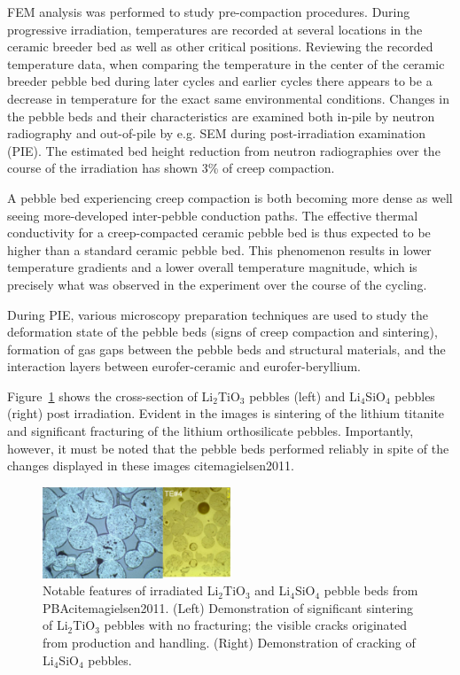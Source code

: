 FEM analysis was performed to study pre-compaction procedures.  During progressive irradiation, temperatures are recorded at several locations in the ceramic breeder bed as well as other critical positions. Reviewing the recorded temperature data, when comparing the temperature in the center of the ceramic breeder pebble bed during later cycles and earlier cycles there appears to be a decrease in temperature for the exact same environmental conditions. Changes in the pebble beds and their characteristics are examined both in-pile by neutron radiography and out-of-pile by e.g. SEM during post-irradiation examination (PIE). The estimated bed height reduction from neutron radiographies over the course of the irradiation has shown 3\% of creep compaction. 

A pebble bed experiencing creep compaction is both becoming more dense as well seeing more-developed inter-pebble conduction paths. The effective thermal conductivity for a creep-compacted ceramic pebble bed is thus expected to be higher than a standard ceramic pebble bed. This phenomenon results in lower temperature gradients and a lower overall temperature magnitude, which is precisely what was observed in the experiment over the course of the cycling. 

During PIE, various microscopy preparation techniques are used to study the deformation state of the pebble beds (signs of creep compaction and sintering), formation of gas gaps between the pebble beds and structural materials, and the interaction layers between eurofer-ceramic and eurofer-beryllium. 

Figure~\ref{fig:pba} shows the cross-section of Li$_2$TiO$_3$ pebbles (left) and Li$_4$SiO$_4$ pebbles (right) post irradiation. Evident in the images is sintering of the lithium titanite and significant fracturing of the lithium orthosilicate pebbles. Importantly, however, it must be noted that the pebble beds performed reliably in spite of the changes displayed in these images cite{magielsen2011}. 


\begin{figure}[t!]
\centering
\includegraphics[width=0.5\textwidth]{chapters/figures/Fig-10}
\caption{Notable features of irradiated Li$_2$TiO$_3$ and Li$_4$SiO$_4$ pebble beds from PBAcite{magielsen2011}. (Left) Demonstration of significant sintering of Li$_2$TiO$_3$ pebbles with no fracturing; the visible cracks originated from production and handling. (Right) Demonstration of cracking of Li$_4$SiO$_4$ pebbles.}
\label{fig:pba}
\end{figure}


